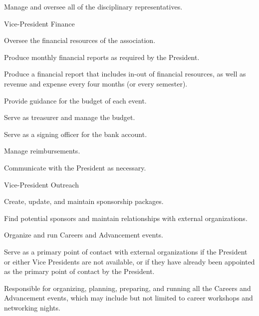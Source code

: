 \documentclass[12pt,a4paper]{article}
\begin{document}
\begin{constitutionlist}
\begin{constitutionlist}
\begin{constitutionlist}
\item Manage and oversee all of the disciplinary representatives.
\end{constitutionlist}

\item Vice-President Finance

\begin{constitutionlist}
\item Oversee the financial resources of the association.

\item Produce monthly financial reports as required by the President.

\item Produce a financial report that includes in-out of financial resources, as well as revenue and expense every four months (or every semester).

\item Provide guidance for the budget of each event.

\item Serve as treasurer and manage the budget.

\item Serve as a signing officer for the bank account.

\item Manage reimbursements.

\item Communicate with the President as necessary.
\end{constitutionlist}

\item Vice-President Outreach

\begin{constitutionlist}
\item Create, update, and maintain sponsorship packages.

\item Find potential sponsors and maintain relationships with external organizations.

\item Organize and run Careers and Advancement events.

\item Serve as a primary point of contact with external organizations if the President or either Vice Presidents are not available, or if they have already been appointed as the primary point of contact by the President.

\item Responsible for organizing, planning, preparing, and running all the Careers and Advancement events, which may include but not limited to career workshops and networking nights.


\end{constitutionlist}
\end{constitutionlist}
\end{constitutionlist}
\end{document}
